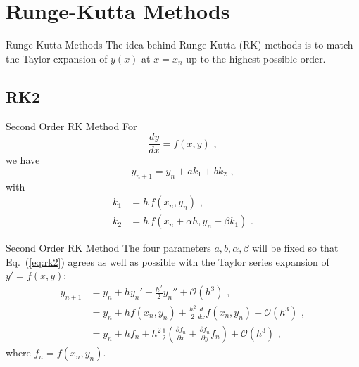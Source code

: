 \documentclass[11pt]{beamer}
\begin{document}
\section{Runge-Kutta Methods}
\begin{frame}[fragile]{Runge-Kutta Methods}
The idea behind Runge-Kutta (RK) methods is to match the Taylor expansion
of $y(x)$ at $x=x_n$ up to the highest possible order.
\end{frame}

\subsection{RK2}
\begin{frame}[fragile]{Second Order RK Method}
 For
\begin{equation}
\frac{dy}{dx} = f(x,y)\,\,,
\end{equation}
we have 
\begin{equation}
\label{eq:rk2}
y_{n+1} = y_n + a k_1 + b k_2\,\,,
\end{equation}
with
\begin{align}
k_1 &= h\,f(x_n,y_n)\,\,,\nonumber\\
k_2 &= h\,f(x_n+\alpha h,y_n + \beta k_1)\,\,.
\end{align}
\end{frame}

\begin{frame}[fragile]{Second Order RK Method}
The four parameters $a,b,\alpha,\beta$ will be fixed so that
Eq.~(\ref{eq:rk2}) agrees as well as possible with the Taylor series expansion
of $y' = f(x,y)$:
\begin{align}
y_{n+1} &= y_n + h y_n' + \frac{h^2}{2} y_n'' + \mathcal{O}(h^3)\,\,,\nonumber\\
&= y_n + h f(x_n,y_n) + \frac{h^2}{2} \frac{d}{dx} f(x_n,y_n) + \mathcal{O}(h^3)\,\,,\nonumber\\
&= y_n + h f_n + h^2 \frac{1}{2}\left( \frac{\partial f_n}{\partial x} + \frac{\partial f_n}{\partial y} f_n \right) + \mathcal{O}(h^3)\,\,,
\end{align}
where $f_n = f(x_n,y_n)$.
\end{frame}
\end{document}

